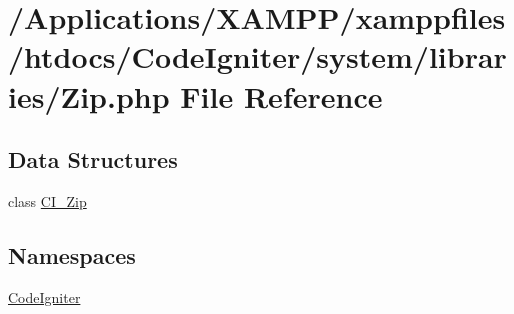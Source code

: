 \hypertarget{_zip_8php}{}\section{/\+Applications/\+X\+A\+M\+P\+P/xamppfiles/htdocs/\+Code\+Igniter/system/libraries/\+Zip.php File Reference}
\label{_zip_8php}
\subsection*{Data Structures}
\begin{DoxyCompactItemize}
\item 
class \mbox{\hyperlink{class_c_i___zip}{C\+I\+\_\+\+Zip}}
\end{DoxyCompactItemize}
\subsection*{Namespaces}
\begin{DoxyCompactItemize}
\item 
 \mbox{\hyperlink{namespace_code_igniter}{Code\+Igniter}}
\end{DoxyCompactItemize}
